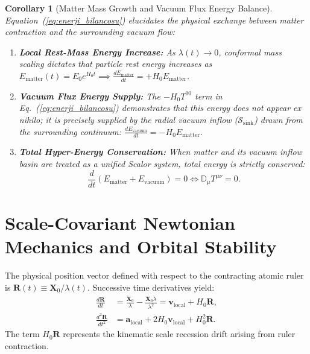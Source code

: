 \documentclass[11pt,a4paper]{article}
\newtheorem{corollary}{Corollary}[theorem]
\begin{document}
\begin{corollary}[Matter Mass Growth and Vacuum Flux Energy Balance]
    \label{cor:madde_vakum_enerji_dengesi_sc}
    Equation~(\ref{eq:enerji_bilancosu}) elucidates the physical exchange between matter contraction and the surrounding vacuum flow:
    \begin{enumerate}
        \item \textbf{Local Rest-Mass Energy Increase:} As $\lambda(t) \to 0$, conformal mass scaling dictates that particle rest energy increases as $E_{\mathrm{matter}}(t) = E_0 e^{H_0 t} \implies \frac{d E_{\mathrm{matter}}}{dt} = + H_0 E_{\mathrm{matter}}$.
        \item \textbf{Vacuum Flux Energy Supply:} The $-H_0 T^{00}$ term in Eq.~(\ref{eq:enerji_bilancosu}) demonstrates that this energy does not appear ex nihilo; it is precisely supplied by the radial vacuum inflow ($\mathcal{S}_{\mathrm{sink}}$) drawn from the surrounding continuum: $\frac{d E_{\mathrm{vacuum}}}{dt} = - H_0 E_{\mathrm{matter}}$.
        \item \textbf{Total Hyper-Energy Conservation:} When matter and its vacuum inflow basin are treated as a unified Scalor system, total energy is strictly conserved:
              \begin{equation}
                  \frac{d}{dt} \left( E_{\mathrm{matter}} + E_{\mathrm{vacuum}} \right) = 0 \iff \mathbb{D}_\mu T^{\mu\nu} = 0.
              \end{equation}
    \end{enumerate}
\end{corollary}

\section{Scale-Covariant Newtonian Mechanics and Orbital Stability}
\label{sec:newton_mekanigi}

The physical position vector defined with respect to the contracting atomic ruler is $\mathbf{R}(t) \equiv \mathbf{X}_0 / \lambda(t)$. Successive time derivatives yield:
\begin{align}
    \frac{d\mathbf{R}}{dt}     & = \frac{\dot{\mathbf{X}}_0}{\lambda} - \frac{\mathbf{X}_0 \dot{\lambda}}{\lambda^2} = \mathbf{v}_{\mathrm{local}} + H_0 \mathbf{R}, \label{eq:olcek_hiz} \\
    \frac{d^2\mathbf{R}}{dt^2} & = \mathbf{a}_{\mathrm{local}} + 2 H_0 \mathbf{v}_{\mathrm{local}} + H_0^2 \mathbf{R}. \label{eq:olcek_ivme}
\end{align}
The term $H_0 \mathbf{R}$ represents the kinematic scale recession drift arising from ruler contraction.
\end{document}
